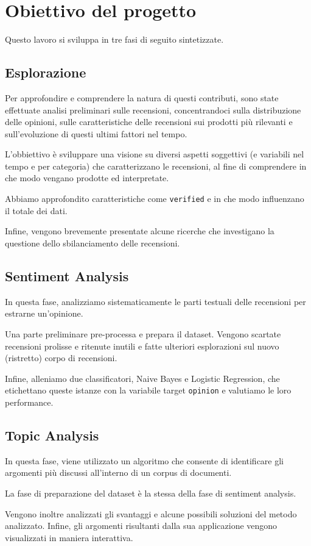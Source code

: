 \section{Obiettivo del progetto}

Questo lavoro si sviluppa in tre fasi di seguito sintetizzate.

\subsection{Esplorazione}

Per approfondire e comprendere la natura di questi contributi, sono state effettuate analisi preliminari sulle recensioni, concentrandoci sulla distribuzione delle opinioni, sulle caratteristiche delle recensioni sui prodotti più rilevanti e sull'evoluzione di questi ultimi fattori nel tempo.
\par
L'obbiettivo è sviluppare una visione su diversi aspetti soggettivi (e variabili nel tempo e per categoria) che caratterizzano le recensioni, al fine di comprendere in che modo vengano prodotte ed interpretate.
\par
Abbiamo approfondito caratteristiche come \texttt{verified} e in che modo influenzano il totale dei dati.
\par
Infine, vengono brevemente presentate alcune ricerche che investigano la questione dello sbilanciamento delle recensioni.

\subsection{Sentiment Analysis}

In questa fase, analizziamo sistematicamente le parti testuali delle recensioni per estrarne un'opinione.
\par
Una parte preliminare pre-processa e prepara il dataset. Vengono scartate recensioni prolisse e ritenute inutili e fatte ulteriori esplorazioni sul nuovo (ristretto) corpo di recensioni.
\par
Infine, alleniamo due classificatori, Naive Bayes e Logistic Regression, che etichettano queste istanze con la variabile target \texttt{opinion} e valutiamo le loro performance.

\subsection{Topic Analysis}

In questa fase, viene utilizzato un algoritmo che consente di identificare gli argomenti più discussi all'interno di un corpus di documenti. 
\par La fase di preparazione del dataset è la stessa della fase di sentiment analysis.
\par
Vengono inoltre analizzati gli svantaggi e alcune possibili soluzioni del metodo analizzato. Infine, gli argomenti risultanti dalla sua applicazione vengono visualizzati in maniera interattiva.

